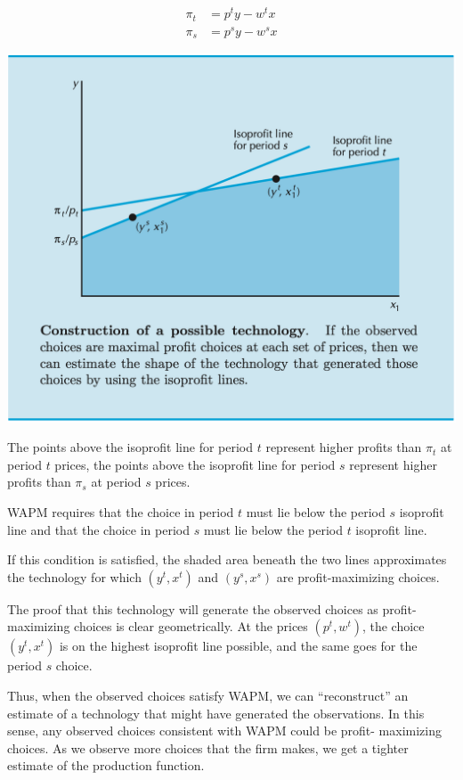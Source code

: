 \documentclass[
]{article}
\begin{document}
\[
\begin{aligned}
\pi_t&=p^ty-w^tx \\
\pi_s&=p^sy-w^sx
\end{aligned}
\]

\includegraphics{figures/rev_prof__2.png}

The points above the isoprofit line for period \(t\) represent higher
profits than \(\pi_t\) at period \(t\) prices, the points above the
isoprofit line for period \(s\) represent higher profits than \(\pi_s\)
at period \(s\) prices.

WAPM requires that the choice in period \(t\) must lie below the period
\(s\) isoprofit line and that the choice in period \(s\) must lie below
the period \(t\) isoprofit line.

If this condition is satisfied, the shaded area beneath the two lines
approximates the technology for which \((y^t, x^t)\) and \((y^s, x^s)\)
are profit-maximizing choices.

The proof that this technology will generate the observed choices as
profit-maximizing choices is clear geometrically. At the prices
\((p^t , w^t )\), the choice \((y^t,x^t)\) is on the highest isoprofit
line possible, and the same goes for the period \(s\) choice.

Thus, when the observed choices satisfy WAPM, we can ``reconstruct'' an
estimate of a technology that might have generated the observations. In
this sense, any observed choices consistent with WAPM could be profit-
maximizing choices. As we observe more choices that the firm makes, we
get a tighter estimate of the production function.
\end{document}
